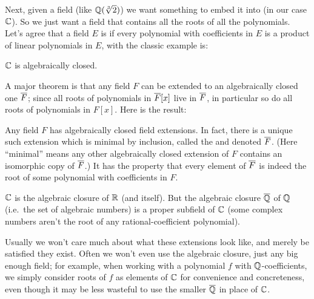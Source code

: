 Next, given a field (like $\mathbb Q(\sqrt[3]{2})$)
we want something to embed it into (in our case $\CC$).
So we just want a field that contains all the roots of all the polynomials.
Let's agree that a field $E$ is  if every polynomial
with coefficients in $E$ is a product of linear polynomials in $E$,
with the classic example is:
\begin{example}
	[$\CC$]
	$\CC$ is algebraically closed.
\end{example}
A major theorem is that any field $F$ can be extended to an algebraically closed one
$\overline F$; since all roots of polynomials in $\overline F[x]$ live in $\overline F$,
in particular so do all roots of polynomials in $F[x]$.
Here is the result:
\begin{theorem}
	Any field $F$ has algebraically closed field extensions.
	In fact, there is a unique such extension which is minimal by inclusion,
	called the  and denoted $\overline F$.
	(Here ``minimal'' means any other algebraically closed extension of $F$
	contains an isomorphic copy of $\overline F$.)
	It has the property that every element of $\overline F$ is indeed the root
	of some polynomial with coefficients in $F$.
\end{theorem}
\begin{example}
	[$\ol{\RR} = \ol{\CC} = \CC \supsetneq \ol{\QQ}$]
	$\CC$ is the algebraic closure of $\mathbb R$ (and itself).
	But the algebraic closure $\overline{\mathbb Q}$ of $\mathbb Q$ (i.e.\ the set of algebraic numbers)
	is a proper subfield of $\CC$
	(some complex numbers aren't the root of any rational-coefficient polynomial).
\end{example}
Usually we won't care much about what these extensions look like,
and merely be satisfied they exist.
Often we won't even use the algebraic closure, just any big enough field;
for example, when working with a polynomial $f$ with $\mathbb Q$-coefficients,
we simply consider roots of $f$ as elements of $\CC$ for convenience and concreteness,
even though it may be less wasteful to use the smaller $\overline{\mathbb Q}$ in place of $\CC$.

